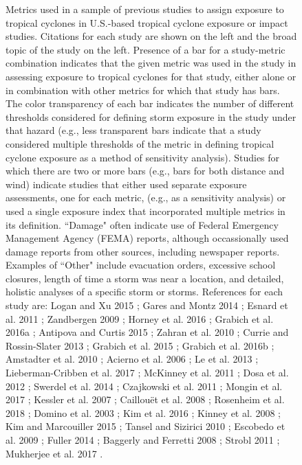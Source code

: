 \documentclass[fleqn,10pt,lineno]{olplainarticle}
\begin{document}
\begin{figure}[tbhp!]
\caption{Metrics used in a sample of previous studies to assign exposure to tropical cyclones in U.S.-based tropical cyclone exposure or impact studies. Citations for each study are shown on the left and the broad topic of the study on the left. Presence of a bar for a study-metric combination indicates that the given metric was used in the study in assessing exposure to tropical cyclones for that study, either alone or in combination with other metrics for which that study has bars. The color transparency of each bar indicates the number of different thresholds considered for defining storm exposure in the study under that hazard (e.g., less transparent bars indicate that a study considered multiple thresholds of the metric in defining tropical cyclone exposure as a method of sensitivity analysis). Studies for which there are two or more bars (e.g., bars for both distance and wind) indicate studies that either used separate exposure assessments, one for each metric, (e.g., as a sensitivity analysis) or used a single exposure index that incorporated multiple metrics in its definition. ``Damage" often indicate use of Federal Emergency Management Agency (FEMA) reports, although occassionally used damage reports from other sources, including newspaper reports. Examples of ``Other" include evacuation orders, excessive school closures, length of time a storm was near a location, and detailed, holistic analyses of a specific storm or storms. References for each study are: Logan and Xu 2015 \cite{logan2015}; Gares and Montz 2014 \cite{gares2014}; Esnard et al. 2011 \cite{esnard2011}; Zandbergen 2009 \cite{zandbergen2009}; Horney et al. 2016 \cite{horney2016}; Grabich et al. 2016a \cite{grabich2016}; Antipova and Curtis 2015 \cite{antipova2015post}; Zahran et al. 2010 \cite{zahran2010}; Currie and Rossin-Slater 2013 \cite{currie2013}; Grabich et al. 2015 \cite{grabich2015}; Grabich et al. 2016b \cite{grabich2016hurricane}; Amstadter et al. 2010 \cite{amstadter2010}; Acierno et al. 2006 \cite{acierno2006}; Le et al. 2013 \cite{le2013}; Lieberman-Cribben et al. 2017 \cite{lieberman2017}; McKinney et al. 2011 \cite{mckinney2011}; Dosa et al. 2012 \cite{dosa2012evacuate}; Swerdel et al. 2014 \cite{swerdel2014}; Czajkowski et al. 2011 \cite{czajkowski2011}; Mongin et al. 2017 \cite{mongin2017}; Kessler et al. 2007 \cite{kessler2007hurricane}; Caillou{\"e}t et al. 2008 \cite{caillouet2008increase}; Rosenheim et al. 2018 \cite{rosenheim2018disaster}; Domino et al. 2003 \cite{domino2003disasters}; Kim et al. 2016 \cite{kim2016}; Kinney et al. 2008 \cite{kinney2008}; Kim and Marcouiller 2015 \cite{kim2015}; Tansel and Sizirici 2010 \cite{tansel2010}; Escobedo et al. 2009 \cite{escobedo2009}; Fuller 2014 \cite{fuller2014}; Baggerly and Ferretti 2008 \cite{baggerly2008impact}; Strobl 2011 \cite{strobl2011economic}; Mukherjee et al. 2017 \cite{mukherjee2017}.}
\label{fig:previousmetrics}
\end{figure}
\end{document}

